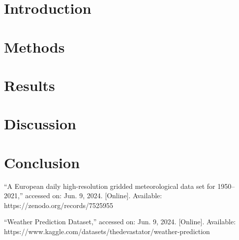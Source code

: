 \documentclass[conference]{IEEEtran}
\title{}
\author{Aditya Tomar \\ CS7641: Assignment 3 \\ atomar45@gatech.edu}
\begin{document}
\maketitle

\begin{abstract}

\end{abstract}

\section{Introduction}


\section{Methods}

\section{Results}
  
\section{Discussion}

\section{Conclusion}



\begin{thebibliography}{1}

``A European daily high-resolution gridded meteorological data set for 1950–2021,'' accessed on: Jun. 9, 2024. [Online]. Available: https://zenodo.org/records/7525955

``Weather Prediction Dataset,'' accessed on: Jun. 9, 2024. [Online]. Available: https://www.kaggle.com/datasets/thedevastator/weather-prediction

\end{thebibliography}
\end{document}
